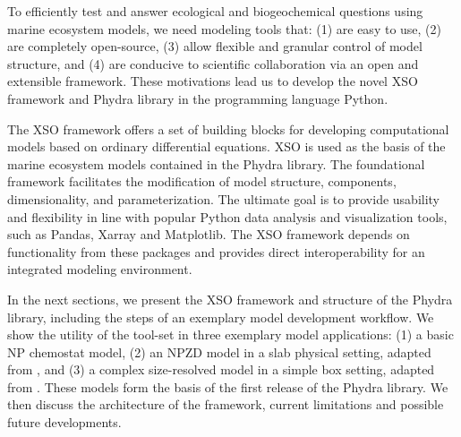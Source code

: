 \documentclass[journal abbreviation, manuscript]{copernicus}
\begin{document}
To efficiently test and answer ecological and biogeochemical questions using marine ecosystem models, we need modeling tools that: (1) are easy to use, (2) are completely open-source, (3) allow flexible and granular control of model structure, and (4) are conducive to scientific collaboration via an open and extensible framework. These motivations lead us to develop the novel XSO framework and Phydra library in the programming language Python. 

The XSO framework offers a set of building blocks for developing computational models based on ordinary differential equations. XSO is used as the basis of the marine ecosystem models contained in the Phydra library. The foundational framework facilitates the modification of model structure, components, dimensionality, and parameterization. The ultimate goal is to provide usability and flexibility in line with popular Python data analysis and visualization tools, such as Pandas, Xarray and Matplotlib. The XSO framework depends on functionality from these packages and provides direct interoperability for an integrated modeling environment.

In the next sections, we present the XSO framework and structure of the Phydra library, including the steps of an exemplary model development workflow. We show the utility of the tool-set in three exemplary model applications: (1) a basic NP chemostat model, (2) an NPZD model in a slab physical setting, adapted from \citet{Anderson2015c}, and (3) a complex size-resolved model in a simple box setting, adapted from \citet{Banas2011b}. These models form the basis of the first release of the Phydra library. We then discuss the architecture of the framework, current limitations and possible future developments.


\end{document}
